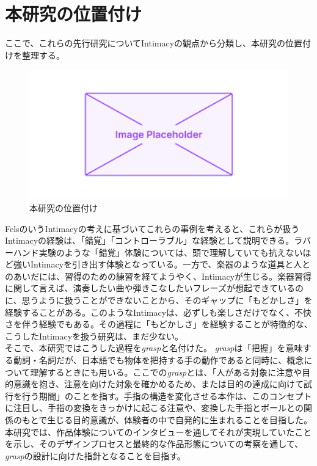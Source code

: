 \section{本研究の位置付け}
ここで、これらの先行研究についてIntimacyの観点から分類し、本研究の位置付けを整理する。

\begin{figure}[H]
  \centering
  \includegraphics[width=15cm]{img/placeholder.png}
  \caption{本研究の位置付け}
  \label{fig:position}
\end{figure}

FelsのいうIntimacyの考えに基づいてこれらの事例を考えると、これらが扱うIntimacyの経験は、「錯覚」「コントローラブル」な経験として説明できる。ラバーハンド実験のような「錯覚」体験については、頭で理解していても抗えないほど強いIntimacyを引き出す体験となっている。一方で、楽器のような道具と人とのあいだには、習得のための練習を経てようやく、Intimacyが生じる。楽器習得に関して言えば、演奏したい曲や弾きこなしたいフレーズが想起できているのに、思うように扱うことができないことから、そのギャップに「もどかしさ」を経験することがある。このようなIntimacyは、必ずしも楽しさだけでなく、不快さを伴う経験でもある。その過程に「もどかしさ」を経験することが特徴的な、こうしたIntimacyを扱う研究は、まだ少ない。\\
そこで、本研究ではこうした過程を\textit{grasp}と名付けた。
\textit{grasp}は「把握」を意味する動詞・名詞だが、日本語でも物体を把持する手の動作であると同時に、概念について理解するときにも用いる。ここでの\textit{grasp}とは、「人がある対象に注意や目的意識を抱き、注意を向けた対象を確かめるため、または目的の達成に向けて試行を行う期間」のことを指す。手指の構造を変化させる本作は、このコンセプトに注目し、手指の変換をきっかけに起こる注意や、変換した手指とボールとの関係のもとで生じる目的意識が、体験者の中で自発的に生まれることを目指した。
本研究では、作品体験についてのインタビューを通してそれが実現していたことを示し、そのデザインプロセスと最終的な作品形態についての考察を通して、\textit{grasp}の設計に向けた指針となることを目指す。
